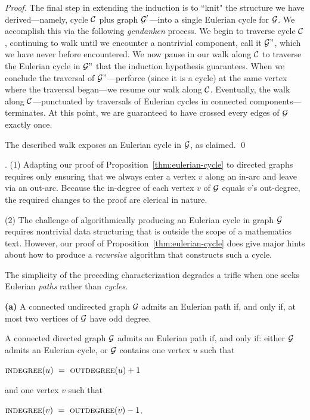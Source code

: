 \begin{proof}
\smallskip

The final step in extending the induction is to ``knit" the structure we have derived---namely, cycle $\mbox{$\cal C$}$ plus graph $\mbox{$\cal G$}'$---into a single Eulerian cycle for $\mbox{$\cal G$}$.  We accomplish this via the following {\em gendanken} process.  We begin to traverse cycle $\mbox{$\cal C$}$, continuing to walk until we encounter a nontrivial component, call it $\mbox{$\cal G$}"$, which we have never before encountered.  We now pause in our walk along $\mbox{$\cal C$}$ to traverse the Eulerian cycle in $\mbox{$\cal G$}"$ that the induction hypothesis guarantees.  When we conclude the traversal of $\mbox{$\cal G$}"$---perforce (since it is a cycle) at the same vertex where the traversal began---we resume our walk along $\mbox{$\cal C$}$.  Eventually, the walk along $\mbox{$\cal C$}$---punctuated by traversals of Eulerian cycles in connected components---terminates.  At this point, we are guaranteed to have crossed every edges of $\mbox{$\cal G$}$ exactly once.

\medskip

The described walk exposes an Eulerian cycle in $\mbox{$\cal G$}$, as claimed.   \qed
\end{proof}

\medskip

.
(1) Adapting our proof of Proposition~\ref{thm:eulerian-cycle} to directed graphs requires only  ensuring that we always enter a vertex $v$ along an in-arc and leave via an out-arc.  Because the in-degree of each vertex $v$ of $\mbox{$\cal G$}$ equals $v$'s out-degree, the required changes to the proof are clerical in nature.

\noindent (2)
The challenge of algorithmically producing an Eulerian cycle in graph $\mbox{$\cal G$}$ requires nontrivial data structuring that is outside the scope of a mathematics text.  However, our proof of Proposition~\ref{thm:eulerian-cycle} does give major hints about how to produce a {\em recursive} algorithm that constructs such a cycle.

\bigskip

The simplicity of the preceding characterization degrades a trifle when
one seeks Eulerian {\em paths} rather than {\em cycles}.

\begin{prop}
\label{thm:eulerian-path}
{\bf (a)}
A connected undirected graph $\mbox{$\cal G$}$ admits an Eulerian path if, and only if, at most two vertices of $\mbox{$\cal G$}$ have odd degree.

\smallskip

A connected directed graph $\mbox{$\cal G$}$ admits an Eulerian path if, and only if: either $\mbox{$\cal G$}$ admits an 
Eulerian cycle, or $\mbox{$\cal G$}$ contains one vertex $u$ such that

\hspace*{.35in}$\mbox{\sc indegree}(u) \ = \ \mbox{\sc outdegree}(u) +1$

\noindent
and one vertex $v$ such that

\hspace*{.35in}$\mbox{\sc indegree}(v) \ = \ \mbox{\sc outdegree}(v) -1$.
\end{prop}

